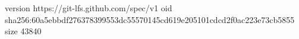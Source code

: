 version https://git-lfs.github.com/spec/v1
oid sha256:60a5ebbdf276378399553dc55570145cd619e205101cdcd2f0ac223e73cb5855
size 43840
